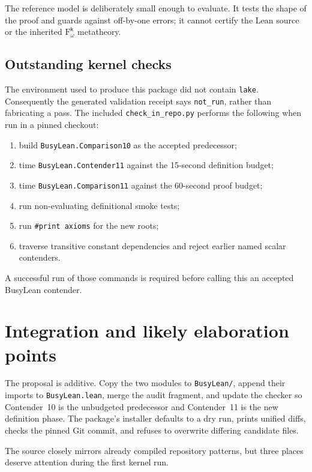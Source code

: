 \documentclass[11pt]{article}
\theoremstyle{definition}
\theoremstyle{remark}
\newcommand{\Fk}{\mathrm{F}_{\omega}^{\mathsf{k}}}
\newcommand{\code}[1]{\texttt{#1}}
\begin{document}
The reference model is deliberately small enough to evaluate.  It tests the
shape of the proof and guards against off-by-one errors; it cannot certify the
Lean source or the inherited $\Fk$ metatheory.

\subsection{Outstanding kernel checks}

The environment used to produce this package did not contain \code{lake}.
Consequently the generated validation receipt says \code{not\_run}, rather than
fabricating a pass.  The included \code{check\_in\_repo.py} performs the
following when run in a pinned checkout:

\begin{enumerate}
\item build \code{BusyLean.Comparison10} as the accepted predecessor;
\item time \code{BusyLean.Contender11} against the 15-second definition budget;
\item time \code{BusyLean.Comparison11} against the 60-second proof budget;
\item run non-evaluating definitional smoke tests;
\item run \code{\#print axioms} for the new roots;
\item traverse transitive constant dependencies and reject earlier named
scalar contenders.
\end{enumerate}

A successful run of those commands is required before calling this an accepted
BusyLean contender.

\section{Integration and likely elaboration points}

The proposal is additive.  Copy the two modules to \code{BusyLean/}, append
their imports to \code{BusyLean.lean}, merge the audit fragment, and update the
checker so Contender~10 is the unbudgeted predecessor and Contender~11 is the
new definition phase.  The package's installer defaults to a dry run, prints
unified diffs, checks the pinned Git commit, and refuses to overwrite differing
candidate files.

The source closely mirrors already compiled repository patterns, but three
places deserve attention during the first kernel run.
\end{document}

